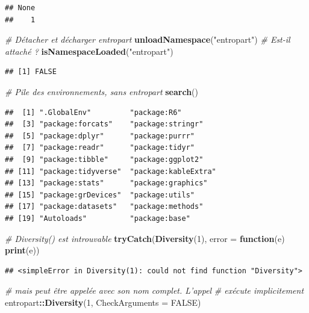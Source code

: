 \documentclass[
  12pt,
  french,
  a4paper,
  extrafontsizes,onecolumn,openright
  ]{memoir}
\newenvironment{Shaded}{\begin{snugshade}}{\end{snugshade}}
\newcommand{\CommentTok}[1]{\textcolor[rgb]{0.56,0.35,0.01}{\textit{#1}}}
\newcommand{\ControlFlowTok}[1]{\textcolor[rgb]{0.13,0.29,0.53}{\textbf{#1}}}
\newcommand{\DataTypeTok}[1]{\textcolor[rgb]{0.13,0.29,0.53}{#1}}
\newcommand{\DecValTok}[1]{\textcolor[rgb]{0.00,0.00,0.81}{#1}}
\newcommand{\KeywordTok}[1]{\textcolor[rgb]{0.13,0.29,0.53}{\textbf{#1}}}
\newcommand{\NormalTok}[1]{#1}
\newcommand{\OperatorTok}[1]{\textcolor[rgb]{0.81,0.36,0.00}{\textbf{#1}}}
\newcommand{\OtherTok}[1]{\textcolor[rgb]{0.56,0.35,0.01}{#1}}
\newcommand{\StringTok}[1]{\textcolor[rgb]{0.31,0.60,0.02}{#1}}
\begin{document}
\begin{verbatim}
## None 
##    1
\end{verbatim}

\begin{Shaded}
\begin{Highlighting}[]
\CommentTok{# Détacher et décharger entropart}
\KeywordTok{unloadNamespace}\NormalTok{(}\StringTok{"entropart"}\NormalTok{)}
\CommentTok{# Est-il attaché ?}
\KeywordTok{isNamespaceLoaded}\NormalTok{(}\StringTok{"entropart"}\NormalTok{)}
\end{Highlighting}
\end{Shaded}

\begin{verbatim}
## [1] FALSE
\end{verbatim}

\begin{Shaded}
\begin{Highlighting}[]
\CommentTok{# Pile des environnements, sans entropart}
\KeywordTok{search}\NormalTok{()}
\end{Highlighting}
\end{Shaded}

\begin{verbatim}
##  [1] ".GlobalEnv"         "package:R6"        
##  [3] "package:forcats"    "package:stringr"   
##  [5] "package:dplyr"      "package:purrr"     
##  [7] "package:readr"      "package:tidyr"     
##  [9] "package:tibble"     "package:ggplot2"   
## [11] "package:tidyverse"  "package:kableExtra"
## [13] "package:stats"      "package:graphics"  
## [15] "package:grDevices"  "package:utils"     
## [17] "package:datasets"   "package:methods"   
## [19] "Autoloads"          "package:base"
\end{verbatim}

\begin{Shaded}
\begin{Highlighting}[]
\CommentTok{# Diversity() est introuvable}
\KeywordTok{tryCatch}\NormalTok{(}\KeywordTok{Diversity}\NormalTok{(}\DecValTok{1}\NormalTok{), }\DataTypeTok{error =} \ControlFlowTok{function}\NormalTok{(e) }\KeywordTok{print}\NormalTok{(e))}
\end{Highlighting}
\end{Shaded}

\begin{verbatim}
## <simpleError in Diversity(1): could not find function "Diversity">
\end{verbatim}

\begin{Shaded}
\begin{Highlighting}[]
\CommentTok{# mais peut être appelée avec son nom complet.  L'appel}
\CommentTok{# exécute implicitement}
\NormalTok{entropart}\OperatorTok{::}\KeywordTok{Diversity}\NormalTok{(}\DecValTok{1}\NormalTok{, }\DataTypeTok{CheckArguments =} \OtherTok{FALSE}\NormalTok{)}
\end{Highlighting}
\end{Shaded}
\end{document}
